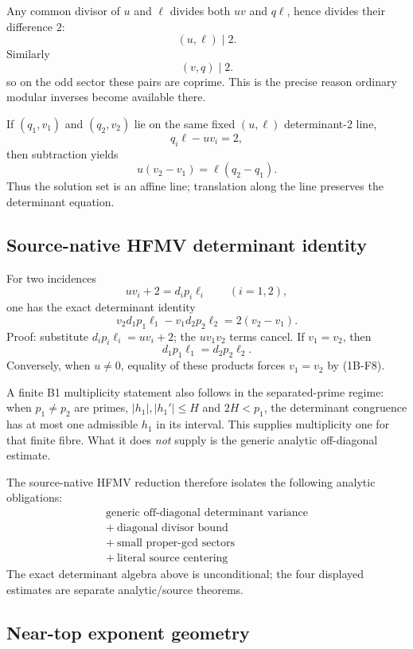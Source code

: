 \documentclass[11pt]{article}
\theoremstyle{definition}
\theoremstyle{remark}
\newcommand{\1}{\mathbf 1}
\begin{document}
Any common divisor of $u$ and $\ell$ divides both $uv$ and $q\ell$, hence divides their difference $2$:
\[
 \boxed{(u,\ell)\mid2.}
\tag{1B-F5}
\]
Similarly
\[
 \boxed{(v,q)\mid2.}
\tag{1B-F6}
\]
so on the odd sector these pairs are coprime.  This is the precise reason ordinary modular inverses become
available there.

If $(q_1,v_1)$ and $(q_2,v_2)$ lie on the same fixed $(u,\ell)$ determinant-2 line,
\[
 q_i\ell-uv_i=2,
\]
then subtraction yields
\[
 \boxed{u(v_2-v_1)=\ell(q_2-q_1).}
\tag{1B-F7}
\]
Thus the solution set is an affine line; translation along the line preserves the determinant equation.

\subsection{Source-native HFMV determinant identity}

For two incidences
\[
 uv_i+2=d_ip_i\ell_i\qquad(i=1,2),
\tag{1B-F8}
\]
one has the exact determinant identity
\[
 \boxed{
 v_2d_1p_1\ell_1-v_1d_2p_2\ell_2=2(v_2-v_1).}
\tag{1B-F9}
\]
Proof: substitute $d_ip_i\ell_i=uv_i+2$; the $uv_1v_2$ terms cancel.
If $v_1=v_2$, then
\[
 d_1p_1\ell_1=d_2p_2\ell_2.
\tag{1B-F10}
\]
Conversely, when $u\ne0$, equality of these products forces $v_1=v_2$ by (1B-F8).

A finite B1 multiplicity statement also follows in the separated-prime regime: when $p_1\ne p_2$ are primes,
$|h_1|,|h_1'|\le H$ and $2H<p_1$, the determinant congruence has at most one admissible $h_1$ in its interval.
This supplies multiplicity one for that finite fibre.  What it does \emph{not} supply is the generic analytic
off-diagonal estimate.

The source-native HFMV reduction therefore isolates the following analytic obligations:
\[
 \boxed{\begin{array}{c}
 \text{generic off-diagonal determinant variance}\\
 +\ \text{diagonal divisor bound}\\
 +\ \text{small proper-gcd sectors}\\
 +\ \text{literal source centering}
 \end{array}}
\tag{1B-F11}
\]
The exact determinant algebra above is unconditional; the four displayed estimates are separate analytic/source
theorems.

\subsection{Near-top exponent geometry}
\end{document}
